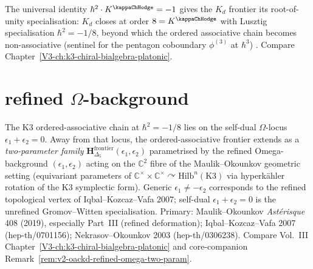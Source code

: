 \begin{remark}
\label{rem:oackdf-2}
The universal identity $\hbar^2 \cdot K^{\kappaChHodge} = -1$
gives the $K_d$ frontier its root-of-unity specialisation:
$K_d$ closes at order $8 = K^{\kappaChHodge}$ with Lusztig
specialisation $\hbar^2 = -1/8$, beyond which the ordered associative
chain becomes non-associative (sentinel for the pentagon coboundary
$\phi^{(3)}$ at $\hbar^3$)
\cite{Lusztig1990,EtingofKazhdan2007PartV}. Compare
Chapter~\ref{V3-ch:k3-chiral-bialgebra-platonic}.
\end{remark}

\section{refined \texorpdfstring{$\Omega$}{Omega}-background}
\label{sec:oackdf-supplement-ii}

\begin{remark}
\label{rem:oackdf-refined-omega}
The K3 ordered-associative chain at $\hbar^2 = -1/8$ lies on
the self-dual $\Omega$-locus $\epsilon_1 + \epsilon_2 = 0$. Away from
that locus, the ordered-associative frontier extends as a
\emph{two-parameter family}
$\mathbf H_{\Delta_5}^{\mathrm{frontier}}(\epsilon_1, \epsilon_2)$
parametrised by the refined Omega-background $(\epsilon_1, \epsilon_2)$
acting on the $\mathbb C^2$ fibre of the Maulik--Okounkov geometric
setting (equivariant parameters of $\mathbb C^\times \times
\mathbb C^\times \curvearrowright \mathrm{Hilb}^n(\mathrm{K3})$ via
hyperk\"ahler rotation of the K3 symplectic form). Generic
$\epsilon_1 \neq -\epsilon_2$ corresponds to the refined topological
vertex of Iqbal--Kozcaz--Vafa 2007; self-dual
$\epsilon_1 + \epsilon_2 = 0$ is the unrefined Gromov--Witten
specialisation. Primary: Maulik--Okounkov \emph{Ast\'erisque} 408
(2019), especially Part~III (refined deformation); Iqbal--Kozcaz--Vafa
2007 (hep-th/0701156); Nekrasov--Okounkov 2003 (hep-th/0306238).
Compare Vol.~III Chapter~\ref{V3-ch:k3-chiral-bialgebra-platonic} and
core-companion Remark~\ref{rem:v2-oackd-refined-omega-two-param}.
\end{remark}

